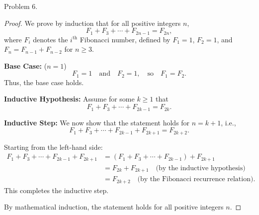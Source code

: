 \documentclass{article}
\begin{document}
Problem 6.
\begin{proof}
We prove by induction that for all positive integers $n$,
\[
F_1 + F_3 + \cdots + F_{2n-1} = F_{2n},
\]
where $F_i$ denotes the $i^{\text{th}}$ Fibonacci number, defined by $F_1 = 1$, $F_2 = 1$, and $F_n = F_{n-1} + F_{n-2}$ for $n \geq 3$.

\textbf{Base Case:} ($n = 1$)
\[
F_1 = 1 \quad \text{and} \quad F_2 = 1, \quad \text{so} \quad F_1 = F_2.
\]
Thus, the base case holds.

\textbf{Inductive Hypothesis:} Assume for some $k \geq 1$ that
\[
F_1 + F_3 + \cdots + F_{2k-1} = F_{2k}.
\]

\textbf{Inductive Step:} We now show that the statement holds for $n = k+1$, i.e.,
\[
F_1 + F_3 + \cdots + F_{2k-1} + F_{2k+1} = F_{2k+2}.
\]

Starting from the left-hand side:
\begin{align*}
F_1 + F_3 + \cdots + F_{2k-1} + F_{2k+1} &= \left(F_1 + F_3 + \cdots + F_{2k-1}\right) + F_{2k+1} \\
&= F_{2k} + F_{2k+1} \quad \text{(by the inductive hypothesis)} \\
&= F_{2k+2} \quad \text{(by the Fibonacci recurrence relation)}.
\end{align*}
This completes the inductive step.

By mathematical induction, the statement holds for all positive integers $n$.
\end{proof}
\end{document}
